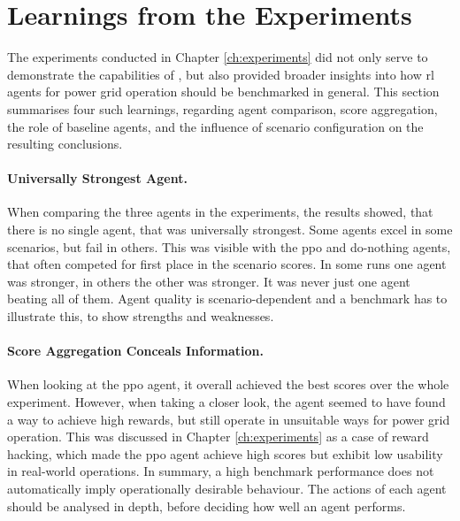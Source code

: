 \section{Learnings from the Experiments}\label{sec:experiment-learnings}
The experiments conducted in Chapter \ref{ch:experiments} did not only serve to demonstrate the capabilities of \benchmark, but also provided broader insights into how \ac{rl} agents for power grid operation should be benchmarked in general. This section summarises four such learnings, regarding agent comparison, score aggregation, the role of baseline agents, and the influence of scenario configuration on the resulting conclusions.

\paragraph{Universally Strongest Agent.}
When comparing the three agents in the experiments, the results showed, that there is no single agent, that was universally strongest. Some agents excel in some scenarios, but fail in others. This was visible with the \ac{ppo} and do-nothing agents, that often competed for first place in the scenario scores. In some runs one agent was stronger, in others the other was stronger. It was never just one agent beating all of them. Agent quality is scenario-dependent and a benchmark has to illustrate this, to show strengths and weaknesses.

\paragraph{Score Aggregation Conceals Information.}
When looking at the \ac{ppo} agent, it overall achieved the best scores over the whole experiment. However, when taking a closer look, the agent seemed to have found a way to achieve high rewards, but still operate in unsuitable ways for power grid operation. This was discussed in Chapter \ref{ch:experiments} as a case of reward hacking, which made the \ac{ppo} agent achieve high scores but exhibit low usability in real-world operations. In summary, a high benchmark performance does not automatically imply operationally desirable behaviour. The actions of each agent should be analysed in depth, before deciding how well an agent performs.

